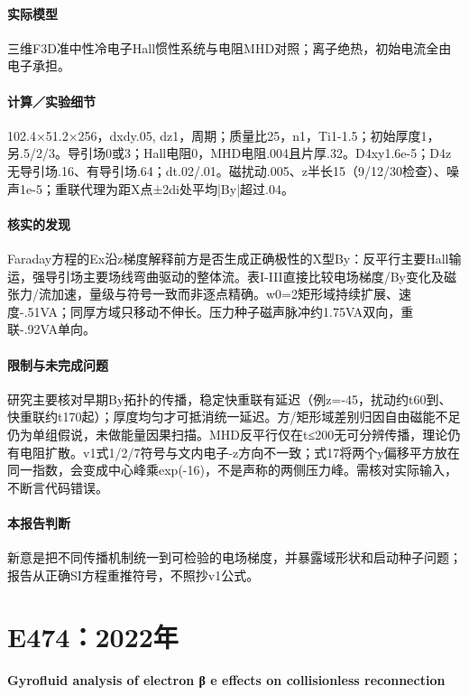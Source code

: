 \paragraph{实际模型}三维F3D准中性冷电子Hall惯性系统与电阻MHD对照；离子绝热，初始电流全由电子承担。

\paragraph{计算／实验细节}102.4×51.2×256，dxdy.05, dz1，周期；质量比25，n1，Ti1-1.5；初始厚度1，另.5/2/3。导引场0或3；Hall电阻0，MHD电阻.004且片厚.32。D4xy1.6e-5；D4z无导引场.16、有导引场.64；dt.02/.01。磁扰动.005、z半长15（9/12/30检查）、噪声1e-5；重联代理为距X点±2di处平均|By|超过.04。

\paragraph{核实的发现}Faraday方程的Ex沿z梯度解释前方是否生成正确极性的X型By：反平行主要Hall输运，强导引场主要场线弯曲驱动的整体流。表I-III直接比较电场梯度/By变化及磁张力/流加速，量级与符号一致而非逐点精确。w0=2矩形域持续扩展、速度-.51VA；同厚方域只移动不伸长。压力种子磁声脉冲约1.75VA双向，重联-.92VA单向。

\paragraph{限制与未完成问题}研究主要核对早期By拓扑的传播，稳定快重联有延迟（例z=-45，扰动约t60到、快重联约t170起）；厚度均匀才可抵消统一延迟。方/矩形域差别归因自由磁能不足仍为单组假说，未做能量因果扫描。MHD反平行仅在t≤200无可分辨传播，理论仍有电阻扩散。v1式1/2/7符号与文内电子-z方向不一致；式17将两个y偏移平方放在同一指数，会变成中心峰乘exp(-16)，不是声称的两侧压力峰。需核对实际输入，不断言代码错误。

\paragraph{本报告判断}新意是把不同传播机制统一到可检验的电场梯度，并暴露域形状和启动种子问题；报告从正确SI方程重推符号，不照抄v1公式。

\section{E474：2022年}\label{paper:E474}

\textbf{Gyrofluid analysis of electron β e effects on collisionless reconnection}\citep{E474}\

